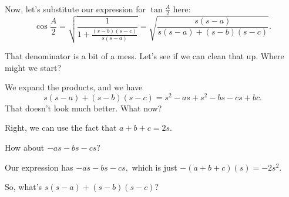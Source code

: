 Now, let's substitute our expression for $\displaystyle \tan\frac{A}{2}$ here:
$$\cos\frac{A}{2} = \sqrt{\frac{1}{1+\frac{(s-b)(s-c)}{s(s-a)}}}= \sqrt{\frac{s(s-a)}{s(s-a)+(s-b)(s-c)}}.$$

That denominator is a bit of a mess.  Let's see if we can clean that up.  Where might we start?




We expand the products, and we have
$$s(s-a) + (s-b)(s-c) = s^2 - as +s^2-bs-cs+bc.$$
That doesn't look much better.  What now?


Right, we can use the fact that $a+b+c = 2s.$

How about $-as-bs-cs?$







Our expression has $-as-bs-cs,$ which is just $-(a+b+c)(s) = -2s^2.$

So, what's $s(s-a) + (s-b)(s-c)?$




